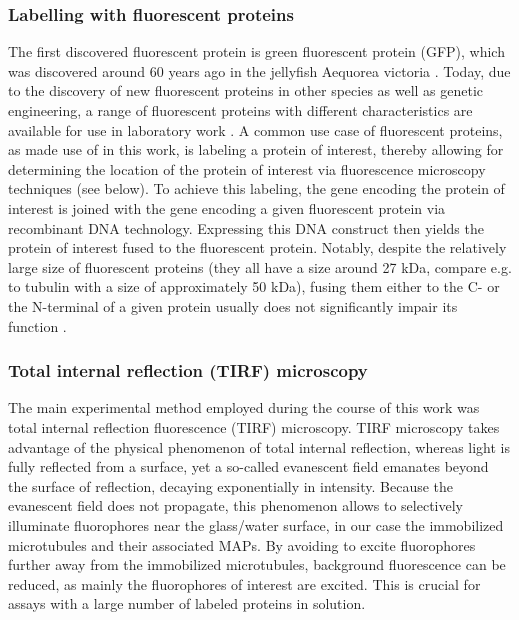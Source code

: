 
\subsubsection{Labelling with fluorescent proteins}
The first discovered fluorescent protein is green fluorescent protein (GFP), which was discovered around 60 years ago in the jellyfish Aequorea victoria . Today, due to the discovery of new fluorescent proteins in other species as well as genetic engineering, a range of fluorescent proteins with different characteristics are available for use in laboratory work . A common use case of fluorescent proteins, as made use of in this work, is labeling a protein of interest, thereby allowing for determining the location of the protein of interest via fluorescence microscopy techniques (see below). To achieve this labeling, the gene encoding the protein of interest is joined with the gene encoding a given fluorescent protein via recombinant DNA technology. Expressing this DNA construct then yields the protein of interest fused to the fluorescent protein. Notably, despite the relatively large size of fluorescent proteins (they all have a size around 27 kDa, compare e.g. to tubulin with a size of approximately 50 kDa), fusing them either to the C- or the N-terminal of a given protein usually does not significantly impair its function . 

\subsubsection{Total internal reflection (TIRF) microscopy}
The main experimental method employed during the course of this work was total internal reflection fluorescence (TIRF) microscopy. TIRF microscopy takes advantage of the physical phenomenon of total internal reflection, whereas light is fully reflected from a surface, yet a so-called evanescent field emanates beyond the surface of reflection, decaying exponentially in intensity. Because the evanescent field does not propagate, this phenomenon allows to selectively illuminate fluorophores near the glass/water surface, in our case the immobilized microtubules and their associated MAPs. By avoiding to excite fluorophores further away from the immobilized microtubules, background fluorescence can be reduced, as mainly the fluorophores of interest are excited. This is crucial for assays with a large number of labeled proteins in solution. 

